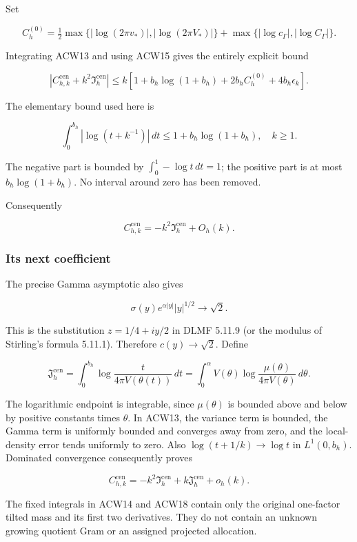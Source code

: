 Set

\[
C_h^{(0)}=
\tfrac12\max\{|\log(2\pi v_*)|,|\log(2\pi V_*)|\}
+\max\{|\log c_\Gamma|,|\log C_\Gamma|\}.
\]

Integrating ACW13 and using ACW15 gives the entirely explicit bound

\[
\boxed{
\left|C_{h,k}^{\mathrm{cen}}+k^2\mathfrak I_h^{\mathrm{cen}}\right|
\le k\left[
1+b_h\log(1+b_h)+2b_h C_h^{(0)}+4b_h\epsilon_k
\right].}
\tag{ACW16}
\]

The elementary bound used here is

\[
\int_0^{b_h}|\log(t+k^{-1})|\,dt
\le1+b_h\log(1+b_h),\quad k\ge1.
\]

The negative part is bounded by \(\int_0^1-\log t\,dt=1\); the positive part is at most \(b_h\log(1+b_h)\). No interval around zero has been removed.

Consequently

\[
\boxed{C_{h,k}^{\mathrm{cen}}=-k^2\mathfrak I_h^{\mathrm{cen}}+O_h(k).}
\tag{ACW17}
\]

\subsubsection{Its next coefficient}\label{acw:its-next-coefficient}

The precise Gamma asymptotic also gives

\[
\sigma(y)e^{\alpha|y|}|y|^{1/2}\longrightarrow\sqrt2.
\]

This is the substitution \(z=1/4+iy/2\) in DLMF 5.11.9 (or the modulus of Stirling's formula 5.11.1). Therefore \(c(y)\to\sqrt2\). Define

\[
\mathfrak J_h^{\mathrm{cen}}
=\int_0^{b_h}
\log\frac{t}{4\pi V(\theta(t))}\,dt
=\int_0^\alpha
V(\theta)\log\frac{\mu(\theta)}{4\pi V(\theta)}\,d\theta.
\tag{ACW18}
\]

The logarithmic endpoint is integrable, since \(\mu(\theta)\) is bounded above and below by positive constants times \(\theta\). In ACW13, the variance term is bounded, the Gamma term is uniformly bounded and converges away from zero, and the local-density error tends uniformly to zero. Also \(\log(t+1/k)\to\log t\) in \(L^1(0,b_h)\). Dominated convergence consequently proves

\[
\boxed{
C_{h,k}^{\mathrm{cen}}
=-k^2\mathfrak I_h^{\mathrm{cen}}
+k\mathfrak J_h^{\mathrm{cen}}+o_h(k).}
\tag{ACW19}
\]

The fixed integrals in ACW14 and ACW18 contain only the original one-factor tilted mass and its first two derivatives. They do not contain an unknown growing quotient Gram or an assigned projected allocation.

